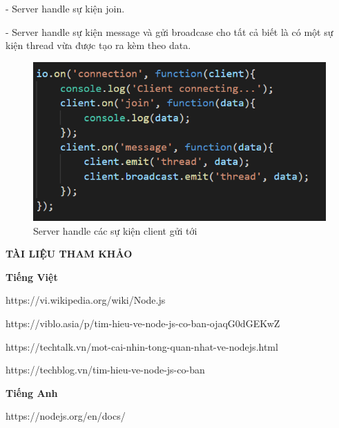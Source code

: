 \documentclass{report}
\begin{document}
- Server handle sự kiện join.

- Server handle sự kiện message và gửi broadcase cho tất cả biết là có một sự kiện thread vừa được tạo ra kèm theo data.

\begin{center}
    \begin{figure}[htp]
    \begin{center}
     \includegraphics[scale=1]{talk2.png}
    \end{center}
    \caption{Server handle các sự kiện client gửi tới}
    \label{refhinh1}
    \end{figure}
\end{center}

\newpage


\newpage
\newpage
\changefontsizes{16pt}
\centerline{\textbf{TÀI LIỆU THAM KHẢO}}

\vspace{1.2cm}
\changefontsizes{14pt}
\textbf{Tiếng Việt}

https://vi.wikipedia.org/wiki/Node.js

https://viblo.asia/p/tim-hieu-ve-node-js-co-ban-ojaqG0dGEKwZ

https://techtalk.vn/mot-cai-nhin-tong-quan-nhat-ve-nodejs.html

https://techblog.vn/tim-hieu-ve-node-js-co-ban

\vspace{3cm}
\textbf{Tiếng Anh}

https://nodejs.org/en/docs/
\end{document}

